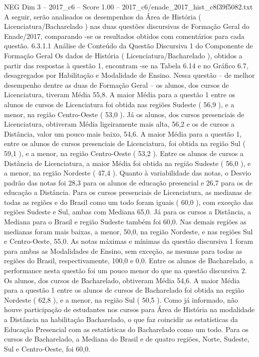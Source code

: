 \begin{textsample}{NEG Dim 3 – 2017\_c6 – Score 1.00 – 2017\_c6/enade\_2017\_hist\_c8f39f5082.txt}
A seguir, serão analisados os desempenhos da Área de História ( Licenciatura/Bacharelado ) nas duas questões discursivas de Formação Geral do Enade/2017, comparando -se os resultados obtidos com comentários para cada questão. 6.3.1.1 Análise de Conteúdo da Questão Discursiva 1 do Componente de Formação Geral Os dados de História ( Licenciatura/Bacharelado ), obtidos a partir das respostas à questão 1, encontram -se na Tabela 6.14 e no Gráfico 6.7, desagregados por Habilitação e Modalidade de Ensino.
Nessa questão – de melhor desempenho dentre as duas de Formação Geral – os alunos, dos cursos de Licenciatura, tiveram Média 55,8.
A maior Média para a questão 1 entre os alunos de cursos de Licenciatura foi obtida nas regiões Sudeste ( 56,9 ), e a menor, na região Centro-Oeste ( 53,0 ).
Já os alunos, dos cursos presenciais de Licenciatura, obtiveram Média ligeiramente mais alta, 56,2 e os de cursos a Distância, valor um pouco mais baixo, 54,6.
A maior Média para a questão 1, entre os alunos de cursos presenciais de Licenciatura, foi obtida na região Sul ( 59,1 ), e a menor, na região Centro-Oeste ( 53,2 ).
Entre os alunos de cursos a Distância de Licenciatura, a maior Média foi obtida na região Sudeste ( 56,0 ), e a menor, na região Nordeste ( 47,4 ).
Quanto à variabilidade das notas, o Desvio padrão das notas foi 28,3 para os alunos de educação presencial e 26,7 para os de educação a Distância.
Para os cursos presenciais de Licenciatura, as medianas de todas as regiões e do Brasil como um todo foram iguais ( 60,0 ), com exceção das regiões Sudeste e Sul, ambas com Mediana 65,0.
Já para os cursos a Distância, a Mediana para o Brasil e região Sudeste também foi 60,0.
Nas demais regiões as medianas foram mais baixas, a menor, 50,0, na região Nordeste, e nas regiões Sul e Centro-Oeste, 55,0.
As notas máximas e mínimas da questão discursiva 1 foram para ambas as Modalidades de Ensino, sem exceção, as mesmas para todas as regiões do Brasil, respectivamente, 100,0 e 0,0.
Entre os alunos de Bacharelado, a performance nesta questão foi um pouco menor do que na questão discursiva 2.
Os alunos, dos cursos de Bacharelado, obtiveram Média 54,6.
A maior Média para a questão 1 entre os alunos de cursos de Bacharelado foi obtida na região Nordeste ( 62,8 ), e a menor, na região Sul ( 50,5 ).
Como já informado, não houve participação de estudantes nos cursos para Área de História na modalidade a Distância na habilitação Bacharelado, o que faz coincidir as estatísticas da Educação Presencial com as estatísticas do Bacharelado como um todo.
Para os cursos de Bacharelado, a Mediana do Brasil e de quatro regiões, Norte, Sudeste, Sul e Centro-Oeste, foi 60,0.

\end{textsample}

